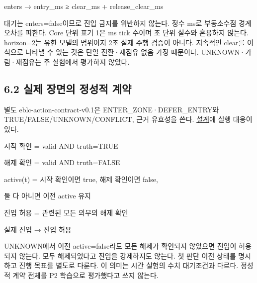 \documentclass[11pt,a4paper]{article}
\begin{document}
\begingroup\small\ttfamily\setlength{\parskip}{1pt}
\noindent\hspace*{0.0em}enters → entry\_\allowbreak{}ms ≥ clear\_\allowbreak{}ms + release\_\allowbreak{}clear\_\allowbreak{}ms\par\endgroup\par

대기는 enters=false이므로 진입 금지를 위반하지 않는다. 정수 ms로 부동소수점 경계 오차를 피한다. Core 단위 표기 {\ttfamily\small 1}은 ms tick 수이며 초 단위 실수와 혼용하지 않는다. horizon=2는 유한 모델의 범위이지 2초 실제 주행 검증이 아니다. 지속적인 clear를 이 식으로 나타낼 수 있는 것은 단일 전환·재점유 없음 가정 때문이다. UNKNOWN·가림·재점유는 주 실험에서 평가하지 않았다.\par

\subsection*{6.2 실제 장면의 정성적 계약}

별도 {\ttfamily\small eblc-action-contract-v0.1}은 ENTER\_\allowbreak{}ZONE·DEFER\_\allowbreak{}ENTRY와 TRUE/FALSE/UNKNOWN/CONFLICT, 근거 유효성을 쓴다. \href{\detokenize{../../../../../../projects/04-guardsynth-coc/docs/designs/PAPER1_ACTION_CONTRACT_DESIGN_V01.md}}{설계}에 실행 대응이 있다.\par

\begingroup\small\ttfamily\setlength{\parskip}{1pt}
\noindent\hspace*{0.0em}시작 확인 = valid AND truth=TRUE\par
\noindent\hspace*{0.0em}해제 확인 = valid AND truth=FALSE\par
\noindent\hspace*{0.0em}active(t) = 시작 확인이면 true, 해제 확인이면 false,\par
\noindent\hspace*{6.0em}둘 다 아니면 이전 active 유지\par
\noindent\hspace*{0.0em}진입 허용 = 관련된 모든 의무의 해제 확인\par
\noindent\hspace*{0.0em}실제 진입 → 진입 허용\par\endgroup\par

UNKNOWN에서 이전 active=false라도 모든 해제가 확인되지 않았으면 진입이 허용되지 않는다. 모두 해제되었다고 진입을 강제하지도 않는다. 첫 판단 이전 상태를 명시하고 진행 목표를 별도로 다룬다. 이 의미는 시간 실험의 수치 대기조건과 다르다. 정성적 계약 전체를 P2 학습으로 평가했다고 쓰지 않는다.\par
\end{document}
